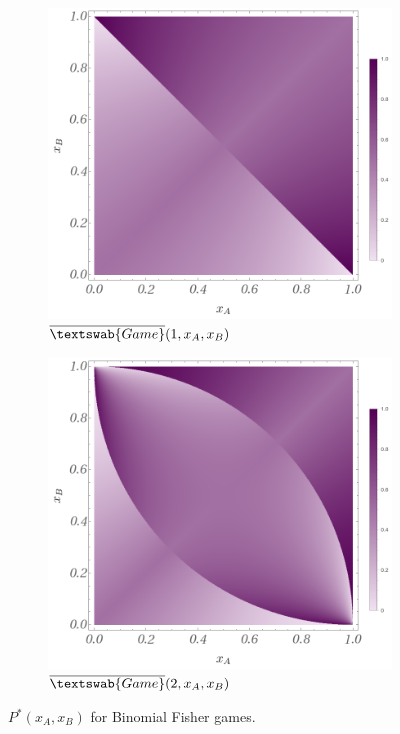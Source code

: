 \documentclass{article}
\theoremstyle{definition}
\newcommand{\InfG}[1]{$\overline{\textswab{Game}}(#1)$}
\begin{document}
\begin{figure}[H]
    \centering
    \begin{subfigure}[b]{0.4\textwidth}
        \includegraphics[width=\textwidth]{img/BinomialFisher_1.png}
        \caption{\InfG{1,x_A,x_B}}
        \label{fig:PG_1}
    \end{subfigure}
    \hspace{0.05\textwidth} %
    \begin{subfigure}[b]{0.4\textwidth}
        \includegraphics[width=\textwidth]{img/BinomialFisher_2.png}
        \caption{\InfG{2,x_A,x_B}}
        \label{fig:PG_2}
    \end{subfigure}
    
    \caption{$P^*(x_A,x_B)$ for Binomial Fisher games.}
    \label{fig:P_InfG_1_2}
\end{figure}
\end{document}
